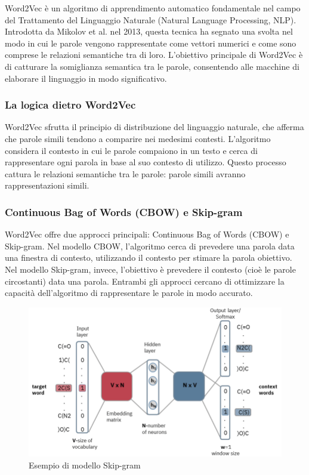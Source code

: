Word2Vec \cite{w2v} è un algoritmo di apprendimento automatico fondamentale nel campo del Trattamento del Linguaggio Naturale (Natural Language Processing, NLP). Introdotta da Mikolov et al. nel 2013, questa tecnica ha segnato una svolta nel modo in cui le parole vengono rappresentate come vettori numerici e come sono comprese le relazioni semantiche tra di loro. L'obiettivo principale di Word2Vec è di catturare la somiglianza semantica tra le parole, consentendo alle macchine di elaborare il linguaggio in modo significativo.

\subsubsection{La logica dietro Word2Vec}
Word2Vec sfrutta il principio di distribuzione del linguaggio naturale, che afferma che parole simili tendono a comparire nei medesimi contesti. L'algoritmo considera il contesto in cui le parole compaiono in un testo e cerca di rappresentare ogni parola in base al suo contesto di utilizzo. Questo processo cattura le relazioni semantiche tra le parole: parole simili avranno rappresentazioni simili.

\subsubsection{Continuous Bag of Words (CBOW) e Skip-gram}
Word2Vec offre due approcci principali: Continuous Bag of Words (CBOW) e Skip-gram. Nel modello CBOW, l'algoritmo cerca di prevedere una parola data una finestra di contesto, utilizzando il contesto per stimare la parola obiettivo. Nel modello Skip-gram, invece, l'obiettivo è prevedere il contesto (cioè le parole circostanti) data una parola. Entrambi gli approcci cercano di ottimizzare la capacità dell'algoritmo di rappresentare le parole in modo accurato.

\begin{center}
    \begin{figure}[H]
        \centering
        \includegraphics[width=0.7\pdfpagewidth]{images/skipgram.jpg}
        \caption{Esempio di modello Skip-gram}
    \end{figure}
\end{center}

